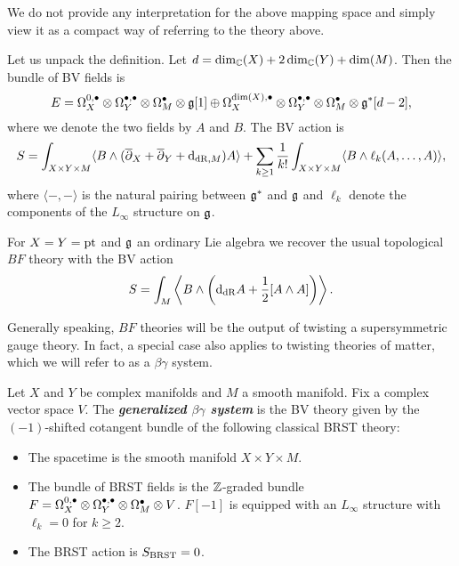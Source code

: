 \documentclass[10pt, oneside]{article}
\newcommand{\defterm}[1]{\textbf{\emph{#1}}}
\begin{document}
\begin{remark}
We do not provide any interpretation for the above mapping space and simply view it as a compact way of referring to the theory above.
\end{remark}

Let us unpack the definition. Let $d = \dim_\mathbb C(X) + 2\dim_\mathbb C(Y) + \dim(M)$. Then the bundle of BV fields is
\[E = \Omega^{0,\bullet}_X \otimes \Omega^{\bullet,\bullet}_Y \otimes \Omega^\bullet_M \otimes \mathfrak g[1]\oplus \Omega^{\dim(X),\bullet}_X \otimes \Omega^{\bullet,\bullet}_Y \otimes \Omega^\bullet_M\otimes \mathfrak g^*[d-2],\]
where we denote the two fields by $A$ and $B$. The BV action is
\[S = \int_{X\times Y\times M} \langle B\wedge (\overline{\partial}_X + \overline{\partial}_Y + {\rm d}_{\mathrm{dR}, M}) A\rangle + \sum_{k\geq 1}\frac{1}{k!} \int_{X\times Y\times M} \langle B\wedge \ell_k(A, \dots, A)\rangle,\]
where $\langle -, -\rangle$ is the natural pairing between $\mathfrak g^*$ and $\mathfrak g$ and $\ell_k$ denote the components of the $L_\infty$ structure on $\mathfrak g$.

\begin{example}
For $X=Y=\operatorname{pt}$ and $\mathfrak g$ an ordinary Lie algebra we recover the usual topological $BF$ theory with the BV action
\[S = \int_M \left\langle B\wedge \left({\rm d}_{\mathrm{dR}} A+ \frac{1}{2}[A\wedge A]\right)\right\rangle.\]
\end{example}

Generally speaking, $BF$ theories will be the output of twisting a supersymmetric gauge theory. 
In fact, a special case also applies to twisting theories of matter, which we will refer to as a $\beta\gamma$ system. 

\begin{definition}
Let $X$ and $Y$ be complex manifolds and $M$ a smooth manifold. Fix a complex vector space $V$. The \defterm{generalized $\beta\gamma$ system} is the BV theory given by the $(-1)$-shifted cotangent bundle of the following classical BRST theory:
\begin{itemize}
\item The spacetime is the smooth manifold $X\times Y\times M$.

\item The bundle of BRST fields is the $\mathbb Z$-graded bundle $F = \Omega^{0,\bullet}_X \otimes \Omega^{\bullet,\bullet}_Y \otimes \Omega^\bullet_M \otimes V$. $F[-1]$ is equipped with an $L_\infty$ structure with $\ell_{k} = 0$ for $k \geq 2$. 

\item The BRST action is $S_{\mathrm{BRST}} = 0$.
\end{itemize}
\end{definition}
\end{document}
